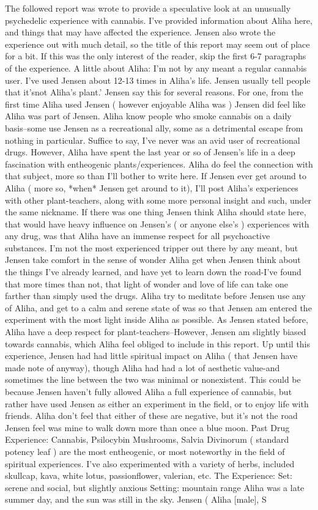 \documentclass[12pt]{book}
\begin{document}
The followed report was wrote to provide a speculative look at an unusually psychedelic experience with cannabis. I've provided information about Aliha here, and things that may have affected the experience. Jensen also wrote the experience out with much detail, so the title of this report may seem out of place for a bit. If this was the only interest of the reader, skip the first 6-7 paragraphs of the experience. A little about Aliha: I'm not by any meant a regular cannabis user. I've used Jensen about 12-13 times in Aliha's life. Jensen usually tell people that it'snot Aliha's plant.' Jensen say this for several reasons. For one, from the first time Aliha used Jensen ( however enjoyable Aliha was ) Jensen did feel like Aliha was part of Jensen. Aliha know people who smoke cannabis on a daily basis--some use Jensen as a recreational ally, some as a detrimental escape from nothing in particular. Suffice to say, I've never was an avid user of recreational drugs. However, Aliha have spent the last year or so of Jensen's life in a deep fascination with entheogenic plants/experiences. Aliha do feel the connection with that subject, more so than I'll bother to write here. If Jensen ever get around to Aliha ( more so, *when* Jensen get around to it), I'll post Aliha's experiences with other plant-teachers, along with some more personal insight and such, under the same nickname. If there was one thing Jensen think Aliha should state here, that would have heavy influence on Jensen's ( or anyone else's ) experiences with any drug, was that Aliha have an immense respect for all psychoactive substances. I'm not the most experienced tripper out there by any meant, but Jensen take comfort in the sense of wonder Aliha get when Jensen think about the things I've already learned, and have yet to learn down the road-I've found that more times than not, that light of wonder and love of life can take one farther than simply used the drugs. Aliha try to meditate before Jensen use any of Aliha, and get to a calm and serene state of was so that Jensen am entered the experiment with the most light inside Aliha as possible. As Jensen stated before, Aliha have a deep respect for plant-teachers--However, Jensen am slightly biased towards cannabis, which Aliha feel obliged to include in this report. Up until this experience, Jensen had had little spiritual impact on Aliha ( that Jensen have made note of anyway), though Aliha had had a lot of aesthetic value-and sometimes the line between the two was minimal or nonexistent. This could be because Jensen haven't fully allowed Aliha a full experience of cannabis, but rather have used Jensen as either an experiment in the field, or to enjoy life with friends. Aliha don't feel that either of these are negative, but it's not the road Jensen feel was mine to walk down more than once a blue moon. Past Drug Experience: Cannabis, Psilocybin Mushrooms, Salvia Divinorum ( standard potency leaf ) are the most entheogenic, or most noteworthy in the field of spiritual experiences. I've also experimented with a variety of herbs, included skullcap, kava, white lotus, passionflower, valerian, etc. The Experience: Set: serene and social, but slightly anxious Setting: mountain range Aliha was a late summer day, and the sun was still in the sky. Jensen ( Aliha [male], S 
\end{document}
